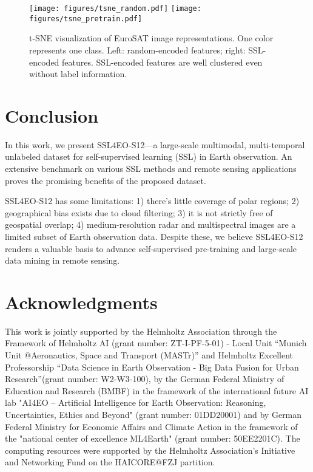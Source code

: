 \documentclass[lettersize,journal]{IEEEtran}
\begin{document}
\begin{figure}[h]
    \centering
\texttt{[image: figures/tsne\_random.pdf]}
    \texttt{[image: figures/tsne\_pretrain.pdf]}
    \caption{t-SNE visualization of EuroSAT image representations. One color represents one class. Left: random-encoded features; right: SSL-encoded features. SSL-encoded features are well clustered even without label information.}
    \label{fig:tsne}
\end{figure}



\vspace{-1em}
\section{Conclusion}
\label{sec:discussion}

In this work, we present SSL4EO-S12---a large-scale multimodal, multi-temporal unlabeled dataset for self-supervised learning (SSL) in Earth observation. An extensive benchmark on various SSL methods and remote sensing applications proves the promising benefits of the proposed dataset.

SSL4EO-S12 has some limitations: 1) there's little coverage of polar regions; 2) geographical bias exists due to cloud filtering; 3) it is not strictly free of geospatial overlap; 4) medium-resolution radar and multispectral images are a limited subset of Earth observation data. Despite these, we believe SSL4EO-S12 renders a valuable basis to advance self-supervised pre-training and large-scale data mining in remote sensing.


\section*{Acknowledgments}
This work is jointly supported by the Helmholtz Association through the Framework of Helmholtz AI (grant  number:  ZT-I-PF-5-01) - Local Unit ``Munich Unit @Aeronautics, Space and Transport (MASTr)'' and Helmholtz Excellent Professorship ``Data Science in Earth Observation - Big Data Fusion for Urban Research''(grant number: W2-W3-100), by the German Federal Ministry of Education and Research (BMBF) in the framework of the international future AI lab "AI4EO -- Artificial Intelligence for Earth Observation: Reasoning, Uncertainties, Ethics and Beyond" (grant number: 01DD20001) and by German Federal Ministry for Economic Affairs and Climate Action in the framework of the "national center of excellence ML4Earth" (grant number: 50EE2201C). The computing resources were supported by the Helmholtz Association’s Initiative and Networking Fund on the HAICORE@FZJ partition.
\end{document}
